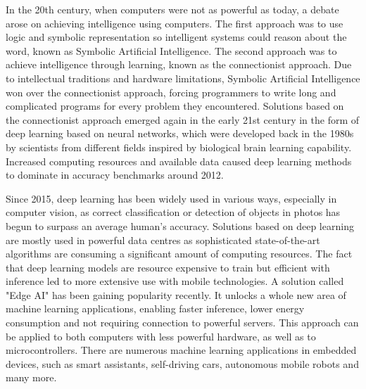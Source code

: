 \documentclass[a4paper,twoside,12pt]{book}
\begin{document}
In the 20th century, when computers were not as powerful as today, a debate arose on achieving intelligence using computers. The first approach was to use logic and symbolic representation so intelligent systems could reason about the word, known as Symbolic Artificial Intelligence. The second approach was to achieve intelligence through learning, known as the connectionist approach. Due to intellectual traditions and hardware limitations, Symbolic Artificial Intelligence won over the connectionist approach, forcing programmers to write long and complicated programs for every problem they encountered. Solutions based on the connectionist approach emerged again in the early 21st century in the form of deep learning based on neural networks, which were developed back in the 1980s by scientists from different fields inspired by biological brain learning capability. Increased computing resources and available data caused deep learning methods to dominate in accuracy benchmarks around 2012.

Since 2015, deep learning has been widely used in various ways, especially in computer vision, as correct classification or detection of objects in photos has begun to surpass an average human's accuracy. Solutions based on deep learning are mostly used in powerful data centres as sophisticated state-of-the-art algorithms are consuming a significant amount of computing resources. The fact that deep learning models are resource expensive to train but efficient with inference led to more extensive use with mobile technologies. A solution called "Edge AI" has been gaining popularity recently. It unlocks a whole new area of machine learning applications, enabling faster inference, lower energy consumption and not requiring connection to powerful servers. This approach can be applied to both computers with less powerful hardware, as well as to microcontrollers. There are numerous machine learning applications in embedded devices, such as smart assistants, self-driving cars, autonomous mobile robots and many more.
\end{document}
